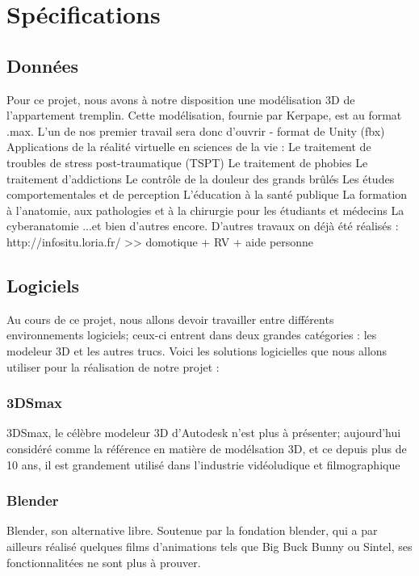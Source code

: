 \section{Spécifications}

\subsection{Données}
	Pour ce projet, nous avons à notre disposition une modélisation 3D de l'appartement tremplin. Cette modélisation, fournie par Kerpape, est au format .max.
	L'un de nos premier travail sera donc d'ouvrir 
	- format de Unity (fbx)
	Applications de la réalité virtuelle en sciences de la vie :
	Le traitement de troubles de stress post-traumatique (TSPT)
	Le traitement de phobies
	Le traitement d'addictions
	Le contrôle de la douleur des grands brûlés
	Les études comportementales et de perception
	L'éducation à la santé publique
	La formation à l'anatomie, aux pathologies et à la chirurgie pour les étudiants et médecins
	La cyberanatomie
	...et bien d'autres encore.
	D'autres travaux on déjà été réalisés : http://infositu.loria.fr/ >> domotique + RV + aide personne
\subsection{Logiciels}
	Au cours de ce projet, nous allons devoir travailler entre différents environnements logiciels; ceux-ci entrent dans deux grandes catégories : les modeleur 3D et les autres trucs.
	Voici les solutions logicielles que nous allons utiliser pour la réalisation de notre projet :
	
	\subsubsection{3DSmax}
		3DSmax, le célèbre modeleur 3D d’Autodesk n’est plus à présenter; aujourd’hui considéré comme la référence en matière de modélsation 3D, et ce depuis plus de 10 ans, il est grandement utilisé dans l’industrie vidéoludique et filmographique
	
	\subsubsection{Blender} 
		Blender, son alternative libre. Soutenue par la fondation blender, qui a par ailleurs réalisé quelques films d’animations tels que Big Buck Bunny ou Sintel, ses fonctionnalitées ne sont plus à prouver.
	

